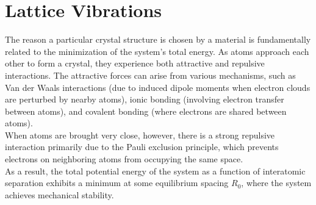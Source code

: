 \section{Lattice Vibrations}
The reason a particular crystal structure is chosen by a material is fundamentally related to the minimization of the system’s total energy. As atoms approach each other to form a crystal, they experience both attractive and repulsive interactions. The attractive forces can arise from various mechanisms, such as Van der Waals interactions (due to induced dipole moments when electron clouds are perturbed by nearby atoms), ionic bonding (involving electron transfer between atoms), and covalent bonding (where electrons are shared between atoms).\\
When atoms are brought very close, however, there is a strong repulsive interaction primarily due to the Pauli exclusion principle, which prevents electrons on neighboring atoms from occupying the same space.\\
As a result, the total potential energy of the system as a function of interatomic separation exhibits a minimum at some equilibrium spacing \( R_0 \), where the system achieves mechanical stability.


